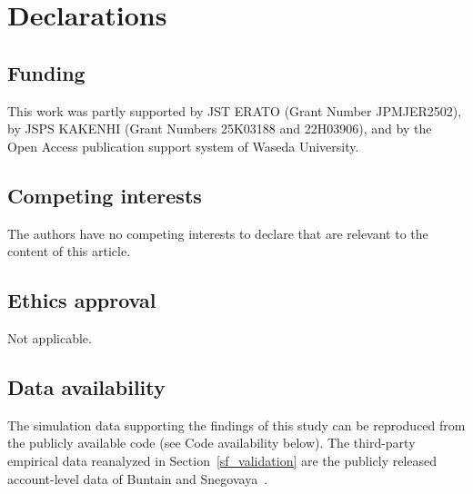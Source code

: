 \documentclass[pdflatex,sn-mathphys-num]{sn-jnl}%
\theoremstyle{thmstyleone}%
\theoremstyle{thmstyletwo}%
\theoremstyle{thmstylethree}%
\begin{document}



\backmatter

\section*{Declarations}

\subsection*{Funding} This work was partly supported by JST ERATO (Grant Number JPMJER2502),
by JSPS KAKENHI (Grant Numbers 25K03188 and 22H03906),
and by the Open Access publication support system of Waseda University.
\subsection*{Competing interests}
The authors have no competing interests to declare that are relevant to the
content of this article.
\subsection*{Ethics approval}
Not applicable.
\subsection*{Data availability}
The simulation data supporting the findings of this study can be reproduced
from the publicly available code (see Code availability below). The third-party
empirical data reanalyzed in Section~\ref{sf_validation} are the publicly
released account-level data of Buntain and Snegovaya~\cite{Buntain2025}.
\end{document}
